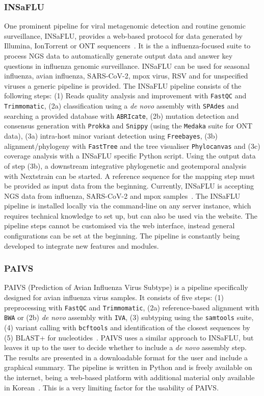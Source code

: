 \subsubsection{INSaFLU}
One prominent pipeline for viral metagenomic detection and routine genomic surveillance, \ac{INSaFLU}, provides a web-based protocol for data generated by Illumina, IonTorrent or \ac{ONT} sequencers~\cite{borges2018insaflu}. It is the a influenza-focused suite to process \ac{NGS} data to automatically generate output data and answer key questions in influenza genomic surveillance. \ac{INSaFLU} can be used for seasonal influenza, avian influenza, SARS-CoV-2, mpox virus, \ac{RSV} and for unspecified viruses a generic pipeline is provided. The \ac{INSaFLU} pipeline consists of the following steps: (1) Reads quality analysis and improvement with \texttt{FastQC} and \texttt{Trimmomatic}, (2a) classification using a \textit{de novo} assembly with \texttt{SPAdes} and searching a provided database with \texttt{ABRIcate}, (2b) mutation detection and consensus generation with \texttt{Prokka} and \texttt{Snippy} (using the \texttt{Medaka} suite for \ac{ONT} data), (3a) intra-host minor variant detection using \texttt{Freebayes}, (3b) alignment/phylogeny with \texttt{FastTree} and the tree visualiser \texttt{Phylocanvas} and (3c) coverage analysis with a \ac{INSaFLU} specific Python script. Using the output data of step (3b), a downstream integrative phylogenetic and geotemporal analysis with Nextstrain can be started. A reference sequence for the mapping step must be provided as input data from the beginning. Currently, \ac{INSaFLU} is accepting \ac{NGS} data from influenza, \ac{SARS-CoV-2} and mpox samples~\cite{borges2018insaflu}. The \ac{INSaFLU} pipeline is installed locally via the command-line on any server instance, which requires technical knowledge to set up, but can also be used via the website. The pipeline steps cannot be customised via the web interface, instead general configurations can be set at the beginning. The pipeline is constantly being developed to integrate new features and modules.

\subsubsection{PAIVS}
\ac{PAIVS} (Prediction of Avian Influenza Virus Subtype) is a pipeline specifically designed for avian influenza virus samples. It consists of five steps: (1) preprocessing with \texttt{FastQC} and \texttt{Trimmomatic}, (2a) reference-based alignment with \texttt{BWA} or (2b) \textit{de novo} assembly with \texttt{IVA}, (3) subtyping using the \texttt{samtools} suite, (4) variant calling with \texttt{bcftools} and identification of the closest sequences by (5) \ac{BLAST}+ for nucleotides~\cite{park2020paivs}. \ac{PAIVS} uses a similar approach to \ac{INSaFLU}, but leaves it up to the user to decide whether to include a \textit{de novo} assembly step. The results are presented in a downloadable format for the user and include a graphical summary. The pipeline is written in Python and is freely available on the internet, being a web-based platform with additional material only available in Korean~\cite{park2020paivs}. This is a very limiting factor for the usability of \ac{PAIVS}.

